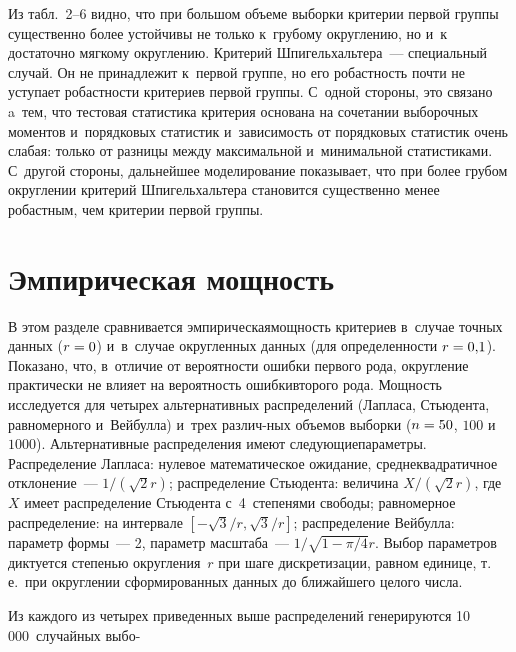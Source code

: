 \begin{multicols}{2}
{}




Из табл.~2--6 видно, что при большом объеме выборки критерии первой группы существенно более устойчивы 
не только к~грубому округлению, но и~к достаточно мягкому округлению. Критерий Шпигельхальтера~--- 
специальный случай. Он не
принадлежит к~первой группе, но его робастность почти не уступает робастности критериев первой группы. С~одной
стороны, это связано a~тем, что тестовая статистика критерия основана на сочетании выборочных моментов 
и~порядковых статистик и~зависимость от порядковых статистик очень слабая: только от разницы между максимальной
и~минимальной статистиками. С~другой стороны, дальнейшее моделирование показывает, что при более грубом
округлении критерий Шпигельхальтера становится существенно менее робастным, чем критерии первой группы.

\vspace*{-7pt}

\section{Эмпирическая мощность}

\vspace*{-2pt}


В этом разделе  сравнивается эмпирическая\linebreak мощность критериев в~случае точных данных ($r\hm=0$) 
и~в~случае округленных данных (для опре\-де\-лен\-ности $r\hm=0{,}1$). Показано, что, в~отличие от ве\-ро\-ят\-ности ошибки
первого рода, округление \mbox{практически} не влияет на вероятность ошибки\linebreak второго рода. Мощность исследуется для
четырех альтернативных распределений (Лапласа, Стьюдента, равномерного и~Вейбулла) и~трех различ-\linebreak ных объемов
выборки ($n\hm=50$, $100$ и~$1000$). Альтернативные распределения имеют сле\-ду\-ющие\linebreak па\-ра\-мет\-ры. Распределение Лапласа: нулевое
математическое ожидание, среднеквадратичное отклонение~--- $1/(\sqrt2r)$; распределение Стьюдента: величина $X/(\sqrt2r)$, где
$X$ имеет распределение \mbox{Стьюдента} с~4~степенями свободы; равномерное распределение: на интервале $[-\sqrt3/r,\sqrt3/r]$;
распределение Вейбулла: параметр формы~--- 2, па\-ра\-метр масштаба~--- $1/\sqrt{1-\pi/4}r$. Выбор параметров диктуется степенью
округления~$r$ при шаге дискретизации, равном единице, т.\,е.\ при округлении сформированных данных до ближайшего
целого числа.

Из каждого из четырех приведенных выше распределений генерируются 10\,000~случайных выбо-\linebreak\vspace*{-10pt}

\pagebreak

\end{multicols}


